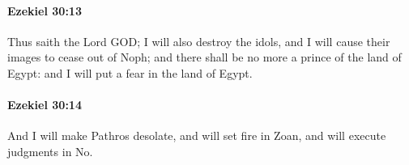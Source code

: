 		\paragraph{Ezekiel 30:13} %
			\label{EZEKIEL-30-13}

			Thus saith the Lord GOD; I will also destroy the idols, and I will cause their images to cease out of Noph; and there shall be no more a prince of the land of Egypt: and I will put a fear in the land of Egypt.


		\paragraph{Ezekiel 30:14} %
			\label{EZEKIEL-30-14}

			And I will make Pathros desolate, and will set fire in Zoan, and will execute judgments in No.


